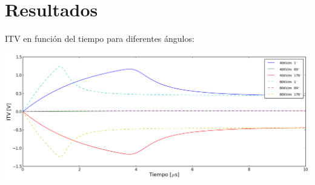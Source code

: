 \documentclass[a0,portrait]{a0poster}
\begin{document}
\begin{multicols}{2}
\begin{multicols}{2}
\end{multicols}

\columnbreak

\section*{Resultados}

ITV en función del tiempo para diferentes ángulos:


		\begin{center}\vspace{1cm}
			\includegraphics[width=1\linewidth]{itv-long}
		\end{center}\vspace{1cm}


\end{multicols}
\end{document}
